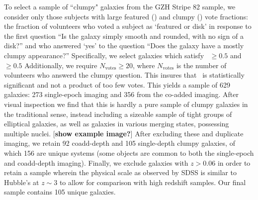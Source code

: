 To select a sample of ``clumpy" galaxies from the GZH Stripe 82 sample, we consider only those subjects with large featured (\ffeat) and clumpy (\fclump) vote fractions: the fraction of volunteers who voted a subject as `featured or disk' in response to the first question ``Is the galaxy simply smooth and rounded, with no sign of a disk?'' and who answered `yes' to the question ``Does the galaxy have a mostly clumpy appearance?'' Specifically, we select galaxies which satisfy \ffeat~$\ge0.5$ and \fclump~$\ge0.5$ Additionally, we require $N_{\mathrm{votes}} \ge 20$, where $N_{\mathrm{votes}}$ is the number of volunteers who answerd the clumpy question. This insures that \fclump~is statistically significant and not a product of too few votes.  This yields a sample of 629 galaxies: 273 single-epoch imaging and 356 from the co-added imaging. After visual inspection we find that this is hardly a pure sample of clumpy galaxies in the traditional sense, instead including a sizeable sample of tight groups of elliptical galaxies, as well as galaxies in various merging states, possessing multiple nuclei. [\textbf{show example image?}] After excluding these and duplicate imaging, we retain 92 coadd-depth and 105 single-depth clumpy galaxies, of which 156 are unique systems (some objects are common to both the single-epoch and coadd-depth imaging). Finally, we exclude galaxies with $z>0.06$ in order to retain a sample wherein the physical scale as observed by SDSS is similar to Hubble's at $z\sim3$ to allow for comparison with high redshift samples. Our final sample contains 105 unique galaxies. 

